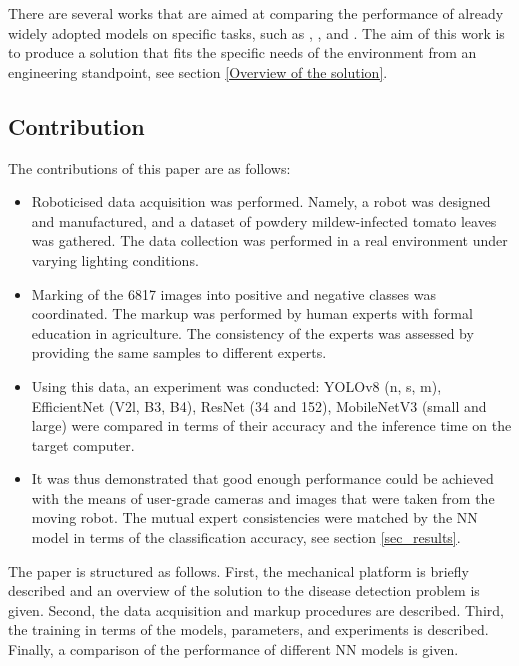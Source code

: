 \begin{description}
There are several works that are aimed at comparing the performance of already widely adopted models on specific tasks, such as \cite{PowderyBOYAR}, \cite{9566132}, and \cite{augmentationShin}.
The aim of this work is to produce a solution that fits the specific needs of the environment from an engineering standpoint, see section \ref{Overview of the solution}.

\subsection{Contribution}

The contributions of this paper are as follows:
\begin{itemize}
    \item Roboticised data acquisition was performed. Namely, a robot was designed and manufactured, and a dataset of powdery mildew-infected tomato leaves was gathered. The data collection was performed in a real environment under varying lighting conditions.
    \item Marking of the 6817 images into positive and negative classes was coordinated. The markup was performed by human experts with formal education in agriculture. The consistency of the experts was assessed by providing the same samples to different experts.
    \item Using this data, an experiment was conducted: YOLOv8 (n, s, m), EfficientNet (V2l, B3, B4), ResNet (34 and 152), MobileNetV3 (small and large) were compared in terms of their accuracy and the inference time on the target computer.
    \item It was thus demonstrated that good enough performance could be achieved with the means of user-grade cameras and images that were taken from the moving robot. The mutual expert consistencies were matched by the NN model in terms of the classification accuracy, see section \ref{sec_results}.
\end{itemize}

The paper is structured as follows.
First, the mechanical platform is briefly described and an overview of the solution to the disease detection problem is given.
Second, the data acquisition and markup procedures are described.
Third, the training in terms of the models, parameters, and experiments is described.
Finally, a comparison of the performance of different NN models is given.

\end{description}
